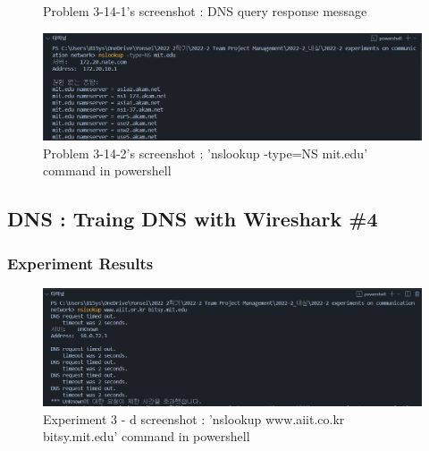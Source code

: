 \begin{enumerate}[label=\bfseries Problem \arabic*:,leftmargin=*,labelindent=1em]
\begin{figure}[!h]
        		\caption{\footnotesize Problem 3-14-1's screenshot : DNS query response message}
        		\vspace{-10pt}
            \end{figure}
            \begin{figure}[!h]\centering
        		\includegraphics[width=.79\textwidth]{image/result_week01/Q3-e-2.png}
        		\caption{\footnotesize Problem 3-14-2's screenshot : 'nslookup -type=NS mit.edu' command in powershell}
        		\vspace{-10pt}
            \end{figure}
    \end{enumerate}
\subsection{DNS : Traing DNS with Wireshark \#4}
    \subsubsection*{Experiment Results}
         \vspace{-2mm}  
        \begin{figure}[!h]\centering
    		\includegraphics[width=.78\textwidth]{image/result_week01/Q3-f-0.png}
    		\caption{\footnotesize Experiment 3 - d screenshot : 'nslookup www.aiit.co.kr bitsy.mit.edu' command in powershell}
    		\vspace{-10pt}
        \end{figure}
